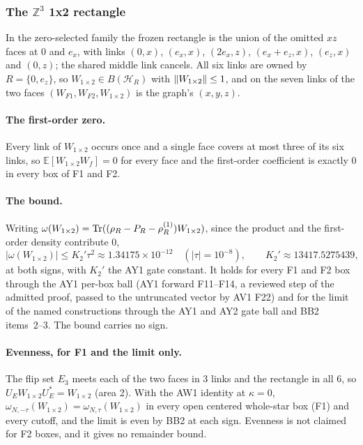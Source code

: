 \subsubsection{\texorpdfstring{The $\mathbb Z^3$ 1x2 rectangle}{The Z3 1x2 rectangle}}
\label{sec:bd2-rectangle}
In the zero-selected family the frozen rectangle is the union of the omitted
$xz$ faces at 0 and $e_x$, with links $(0,x)$, $(e_x,x)$, $(2e_x,z)$,
$(e_x+e_z,x)$, $(e_z,x)$ and $(0,z)$; the shared middle link cancels. All six
links are owned by $R=\{0,e_z\}$, so $W_{1\times2}\in B(\mathcal H_R)$ with
$\left\lVert W_{1\times2}\right\rVert\le1$, and on the seven links of the two faces
$(W_{F1},W_{F2},W_{1\times2})$ is the graph's $(x,y,z)$.

\paragraph{The first-order zero.} Every link of $W_{1\times2}$ occurs once and
a single face covers at most three of its six links, so
$\mathbb E[W_{1\times2}W_f]=0$ for every face and the first-order coefficient is
exactly 0 in every box of F1 and F2.

\paragraph{The bound.} Writing
$\omega(W_{1\times2})=\operatorname{Tr}((\rho_R-P_R-\rho^{(1)}_R)W_{1\times2})$, since the
product and the first-order density contribute 0,
\begin{equation}
 |\omega(W_{1\times2})|\le K_2'\tau^2\approx1.34175\times10^{-12}\quad(|\tau|=10^{-8}),
 \qquad K_2'\approx13417.5275439,
 \label{eq:bd2-rectangle}
\end{equation}
at both signs, with $K_2'$ the AY1 gate constant. It holds for every F1 and F2
box through the AY1 per-box ball (AY1 forward F11--F14, a reviewed step of the
admitted proof, passed to the untruncated vector by AV1 F22) and for the limit
of the named constructions through the AY1 and AY2 gate ball and BB2
items~2--3. The bound carries no sign.

\paragraph{Evenness, for F1 and the limit only.} The flip set $E_3$ meets each
of the two faces in 3 links and the rectangle in all 6, so
$U_EW_{1\times2}U_E^*=W_{1\times2}$ (area 2). With the AW1 identity at
$\kappa=0$, $\omega_{N,-\tau}(W_{1\times2})=\omega_{N,\tau}(W_{1\times2})$ in every
open centered whole-star box (F1) and every cutoff, and the limit is even by
BB2 at each sign. Evenness is not claimed for F2 boxes, and it gives no
remainder bound.

